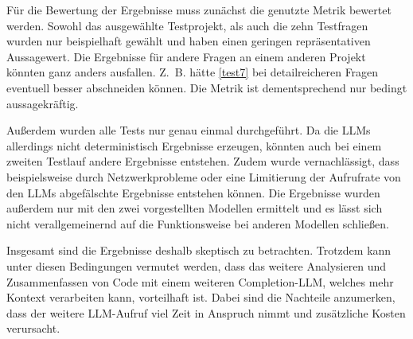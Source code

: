 \documentclass[../main.tex]{subfiles}
\begin{document}
Für die Bewertung der Ergebnisse muss zunächst die genutzte Metrik bewertet werden.
Sowohl das ausgewählte Testprojekt, als auch die zehn Testfragen wurden nur beispielhaft gewählt und haben einen geringen repräsentativen Aussagewert. Die Ergebnisse für andere Fragen an einem anderen Projekt könnten ganz anders ausfallen.
Z. B. hätte \ref{test7} bei detailreicheren Fragen eventuell besser abschneiden können.
Die Metrik ist dementsprechend nur bedingt aussagekräftig.

Außerdem wurden alle Tests nur genau einmal durchgeführt. 
Da die \glspl{LLM} allerdings nicht deterministisch Ergebnisse erzeugen, könnten auch bei einem zweiten Testlauf andere Ergebnisse entstehen.
Zudem wurde vernachlässigt, dass beispielsweise durch Netzwerkprobleme oder eine Limitierung der Aufrufrate von den \glspl{LLM} abgefälschte Ergebnisse entstehen können.
Die Ergebnisse wurden außerdem nur mit den zwei vorgestellten Modellen ermittelt und es lässt sich nicht verallgemeinernd auf die Funktionsweise bei anderen Modellen schließen.

Insgesamt sind die Ergebnisse deshalb skeptisch zu betrachten.
Trotzdem kann unter diesen Bedingungen vermutet werden, dass das weitere Analysieren und Zusammenfassen von Code mit einem weiteren Completion-\gls{LLM}, welches mehr Kontext verarbeiten kann, vorteilhaft ist.
Dabei sind die Nachteile anzumerken, dass der weitere \gls{LLM}-Aufruf viel Zeit in Anspruch nimmt und zusätzliche Kosten verursacht. 
\end{document}
